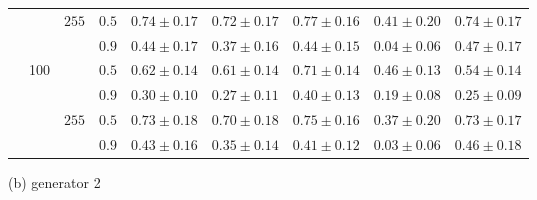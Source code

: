 \documentclass[graybox]{svmult}
\begin{document}
\begin{table}
\begin{tabular}{c|c|c|c|ccccc}
&& \multirow{3}{*}{$255$}
  & $0.5$ & $0.74\pm0.17$ & $0.72\pm0.17$ & $\bm{0.77\pm0.16}$ & $0.41\pm0.20$ & $0.74\pm0.17$ \\
&&& $0.9$ & $0.44\pm0.17$ & $0.37\pm0.16$ & $0.44\pm0.15$ & $0.04\pm0.06$ & $\bm{0.47\pm0.17}$ \\\cline{2-9}
&\multirow{6}{*}{100}
& \multirow{3}{*}{$9$}
  & $0.5$ & $0.62\pm0.14$ & $0.61\pm0.14$ & $\bm{0.71\pm0.14}$ & $0.46\pm0.13$ & $0.54\pm0.14$ \\
&&& $0.9$ & $0.30\pm0.10$ & $0.27\pm0.11$ & $\bm{0.40\pm0.13}$ & $0.19\pm0.08$ & $0.25\pm0.09$ \\\cline{3-9}
&& \multirow{3}{*}{$255$}
  & $0.5$ & $0.73\pm0.18$ & $0.70\pm0.18$ & $\bm{0.75\pm0.16}$ & $0.37\pm0.20$ & $0.73\pm0.17$ \\
&&& $0.9$ & $0.43\pm0.16$ & $0.35\pm0.14$ & $0.41\pm0.12$ & $0.03\pm0.06$ & $\bm{0.46\pm0.18}$ \\
\bottomrule[1.5pt]
\end{tabular}
(b) generator 2
\end{table}
\end{document}
